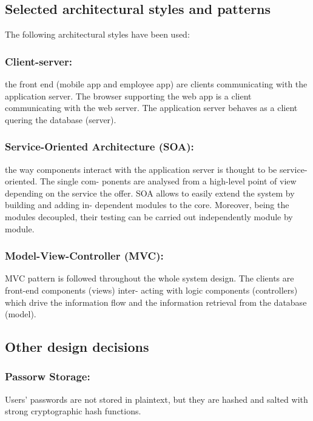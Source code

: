 \subsection{Selected architectural styles and patterns}

	The following architectural styles have been used:
	\subsubsection{	Client-server:}

	the front end (mobile app and employee app) are clients
	communicating with the application server. The browser supporting the web
	app is a client communicating with the web server. The application server
	behaves as a client quering the database (server).
	
	\subsubsection{Service-Oriented Architecture (SOA):}

	the way components interact
	with the application server is thought to be service-oriented. The single com-
	ponents are analysed from a high-level point of view depending on the service
	the offer. SOA allows to easily extend the system by building and adding in-
	dependent modules to the core. Moreover, being the modules decoupled, their
	testing can be carried out independently module by module.
	
	\subsubsection{Model-View-Controller (MVC):}

	MVC pattern is followed throughout
	the whole system design. The clients are front-end components (views) inter-
	acting with logic components (controllers) which drive the information flow and
	the information retrieval from the database (model).
	
\subsection{Other design decisions}
	\subsubsection{Passorw Storage:}
	Users’ passwords are not stored in plaintext, but they are hashed and salted
	with strong cryptographic hash functions.